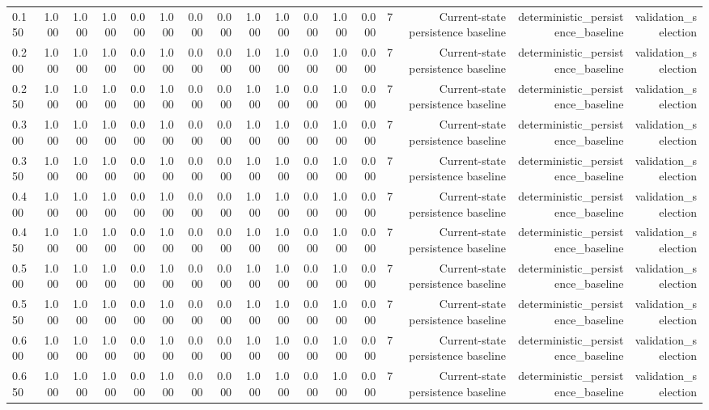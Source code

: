 \begin{tabular}{lrrrrrrrrrrrrrrrr}
0.150 & 1.000 & 1.000 & 1.000 & 0.000 & 1.000 & 0.000 & 0.000 & 1.000 & 1.000 & 0.000 & 1.000 & 0.000 & 7 & Current-state persistence baseline & deterministic\_persistence\_baseline & validation\_selection \\
0.200 & 1.000 & 1.000 & 1.000 & 0.000 & 1.000 & 0.000 & 0.000 & 1.000 & 1.000 & 0.000 & 1.000 & 0.000 & 7 & Current-state persistence baseline & deterministic\_persistence\_baseline & validation\_selection \\
0.250 & 1.000 & 1.000 & 1.000 & 0.000 & 1.000 & 0.000 & 0.000 & 1.000 & 1.000 & 0.000 & 1.000 & 0.000 & 7 & Current-state persistence baseline & deterministic\_persistence\_baseline & validation\_selection \\
0.300 & 1.000 & 1.000 & 1.000 & 0.000 & 1.000 & 0.000 & 0.000 & 1.000 & 1.000 & 0.000 & 1.000 & 0.000 & 7 & Current-state persistence baseline & deterministic\_persistence\_baseline & validation\_selection \\
0.350 & 1.000 & 1.000 & 1.000 & 0.000 & 1.000 & 0.000 & 0.000 & 1.000 & 1.000 & 0.000 & 1.000 & 0.000 & 7 & Current-state persistence baseline & deterministic\_persistence\_baseline & validation\_selection \\
0.400 & 1.000 & 1.000 & 1.000 & 0.000 & 1.000 & 0.000 & 0.000 & 1.000 & 1.000 & 0.000 & 1.000 & 0.000 & 7 & Current-state persistence baseline & deterministic\_persistence\_baseline & validation\_selection \\
0.450 & 1.000 & 1.000 & 1.000 & 0.000 & 1.000 & 0.000 & 0.000 & 1.000 & 1.000 & 0.000 & 1.000 & 0.000 & 7 & Current-state persistence baseline & deterministic\_persistence\_baseline & validation\_selection \\
0.500 & 1.000 & 1.000 & 1.000 & 0.000 & 1.000 & 0.000 & 0.000 & 1.000 & 1.000 & 0.000 & 1.000 & 0.000 & 7 & Current-state persistence baseline & deterministic\_persistence\_baseline & validation\_selection \\
0.550 & 1.000 & 1.000 & 1.000 & 0.000 & 1.000 & 0.000 & 0.000 & 1.000 & 1.000 & 0.000 & 1.000 & 0.000 & 7 & Current-state persistence baseline & deterministic\_persistence\_baseline & validation\_selection \\
0.600 & 1.000 & 1.000 & 1.000 & 0.000 & 1.000 & 0.000 & 0.000 & 1.000 & 1.000 & 0.000 & 1.000 & 0.000 & 7 & Current-state persistence baseline & deterministic\_persistence\_baseline & validation\_selection \\
0.650 & 1.000 & 1.000 & 1.000 & 0.000 & 1.000 & 0.000 & 0.000 & 1.000 & 1.000 & 0.000 & 1.000 & 0.000 & 7 & Current-state persistence baseline & deterministic\_persistence\_baseline & validation\_selection \\

\end{tabular}
